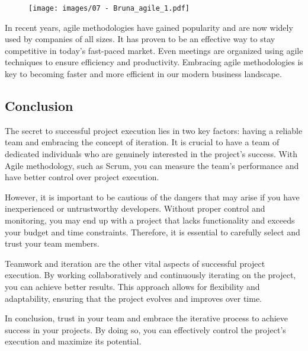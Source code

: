 \begin{figure}[!h]
  \centering
  \texttt{[image: images/07 - Bruna\_agile\_1.pdf]}
\end{figure}

In recent years, agile methodologies have gained popularity and are now
widely used by companies of all sizes. It has proven to be an effective
way to stay competitive in today's fast-paced market. Even meetings are
organized using agile techniques to ensure efficiency and productivity.
Embracing agile methodologies is key to becoming faster and more
efficient in our modern business landscape.

\subsection{Conclusion}

The secret to successful project execution lies in two key factors:
having a reliable team and embracing the concept of iteration. It is
crucial to have a team of dedicated individuals who are genuinely
interested in the project's success. With Agile methodology, such as
Scrum, you can measure the team's performance and have better control
over project execution.

However, it is important to be cautious of the dangers that may arise if
you have inexperienced or untrustworthy developers. Without proper
control and monitoring, you may end up with a project that lacks
functionality and exceeds your budget and time constraints. Therefore,
it is essential to carefully select and trust your team members.

Teamwork and iteration are the other vital aspects of successful project
execution. By working collaboratively and continuously iterating on the
project, you can achieve better results. This approach allows for
flexibility and adaptability, ensuring that the project evolves and
improves over time.

In conclusion, trust in your team and embrace the iterative process to
achieve success in your projects. By doing so, you can effectively
control the project's execution and maximize its potential.
